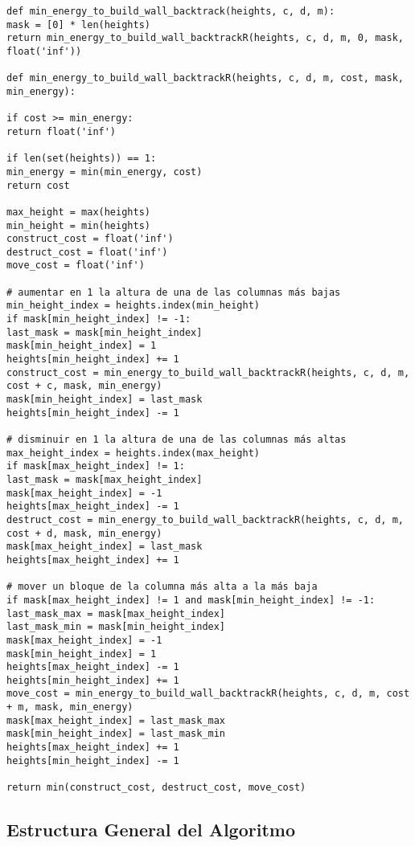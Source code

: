 \documentclass[a4paper,12pt]{article}
\begin{document}
\begin{verbatim}
def min_energy_to_build_wall_backtrack(heights, c, d, m):
mask = [0] * len(heights)
return min_energy_to_build_wall_backtrackR(heights, c, d, m, 0, mask, float('inf'))

def min_energy_to_build_wall_backtrackR(heights, c, d, m, cost, mask, min_energy):

if cost >= min_energy:
return float('inf') 

if len(set(heights)) == 1:
min_energy = min(min_energy, cost)
return cost

max_height = max(heights)
min_height = min(heights)
construct_cost = float('inf')
destruct_cost = float('inf')
move_cost = float('inf')

# aumentar en 1 la altura de una de las columnas más bajas 
min_height_index = heights.index(min_height)
if mask[min_height_index] != -1:
last_mask = mask[min_height_index]
mask[min_height_index] = 1
heights[min_height_index] += 1
construct_cost = min_energy_to_build_wall_backtrackR(heights, c, d, m, cost + c, mask, min_energy)
mask[min_height_index] = last_mask
heights[min_height_index] -= 1

# disminuir en 1 la altura de una de las columnas más altas
max_height_index = heights.index(max_height)
if mask[max_height_index] != 1:
last_mask = mask[max_height_index]
mask[max_height_index] = -1
heights[max_height_index] -= 1
destruct_cost = min_energy_to_build_wall_backtrackR(heights, c, d, m, cost + d, mask, min_energy)
mask[max_height_index] = last_mask
heights[max_height_index] += 1

# mover un bloque de la columna más alta a la más baja
if mask[max_height_index] != 1 and mask[min_height_index] != -1:
last_mask_max = mask[max_height_index]
last_mask_min = mask[min_height_index]
mask[max_height_index] = -1
mask[min_height_index] = 1
heights[max_height_index] -= 1
heights[min_height_index] += 1
move_cost = min_energy_to_build_wall_backtrackR(heights, c, d, m, cost + m, mask, min_energy)
mask[max_height_index] = last_mask_max
mask[min_height_index] = last_mask_min
heights[max_height_index] += 1
heights[min_height_index] -= 1

return min(construct_cost, destruct_cost, move_cost)

\end{verbatim}

\subsection{Estructura General del Algoritmo}
\end{document}
